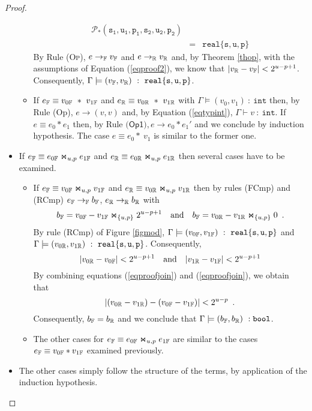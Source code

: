\begin{proof}
\begin{itemize}
\begin{itemize}
$$\begin{array}{rcl}
{\mathcal{P}_\ast(\mathtt{s_1},\mathtt{u_1},\mathtt{p_1},\mathtt{s_2},\mathtt{u_2},\mathtt{p_2})}\\
&=&\mathtt{real\{s,u,p\}}
\end{array}
$$
By Rule \textsc{(Op)}, $e\rightarrow_{\mathbb{F}} v_{\mathbb{F}}$ and $e\rightarrow_{\mathbb{R}} v_{\mathbb{R}}$ and, 
by Theorem \ref{thop}, with  the assumptions of Equation (\ref{eqproof2}), we know that $|v_{\mathbb{R}}-v_{\mathbb{F}}|<2^{u-p+1}$.
Consequently, $\Gamma\models (v_\bbf,v_\bbr)\ :\ \F{s}{u}{p}$.
\item If $e_\bbf\equiv v_{0\bbf}\ \ast\ v_{1\bbf}$ and $e_\bbr\equiv v_{0\bbr}\ \ast\ v_{1\bbr}$
 with $\Gamma\models( v_0, v_1)\ :\ \mathtt{int}$ then,
by Rule \textsf{(Op)}, $e\rightarrow (v,v)$ and,
by Equation (\ref{eqtypint}), $\Gamma\vdash v\ :\ \mathtt{int}$.
If $e\equiv e_0\ast e_1$ then, by Rule $\textsf{(Op1)}, e\rightarrow e_0\ast e_1'$ and we conclude by
induction hypothesis. The case $e\equiv e_0\ast\ v_1$ is similar to the former one.
\end{itemize}
\item If $e_{\mathbb{F}}\equiv e_{0\mathbb{F}}\Join_{u,p} e_{1\mathbb{F}}$ and $e_{\mathbb{R}}\equiv e_{0\mathbb{R}}\Join_{u,p} e_{1\mathbb{R}}$
then several cases have to be examined.
\begin{itemize}
\item If $e_{\mathbb{F}}\equiv v_{0\mathbb{F}}\Join_{u,p} v_{1\mathbb{F}}$ and
$e_{\mathbb{R}}\equiv v_{0\mathbb{R}}\Join_{u,p} v_{1\mathbb{R}}$
 then by rules \textsf{(FCmp)} and \textsf{(RCmp)}
$e_{\mathbb{F}}\rightarrow_{\mathbb{F}} b_{\mathbb{F}}$, $e_{\mathbb{R}}\rightarrow_{\mathbb{R}} b_{\mathbb{R}}$ with
\begin{equation}\label{eqproofjoin}
b_{\mathbb{F}}=     v_{0\mathbb{F}}- v_{1\mathbb{F}} \Join_{\{u,p\}} 2^{u-p+1}
\quad\text{and}\quad
b_{\mathbb{F}}=     v_{0\mathbb{R}} -v_{1\mathbb{R}} \Join_{\{u,p\}} 0 \enspace .
\end{equation}
By rule \textsf{(RCmp)} of Figure \ref{figmod}, $\Gamma\models (v_{0\bbf},v_{1\bbf})\ :\ \F{s}{u}{p}$
and $\Gamma\models (v_{0\mathbb{R}},v_{1\mathbb{R}})\ :\ \mathtt{real\{s,u,p\}}$.
Consequently,
\begin{equation}
|v_{0\mathbb{R}}-v_{0\mathbb{F}}| < 2^{u-p+1}\quad\text{and}\quad |v_{1\mathbb{R}}-v_{1\mathbb{F}}| < 2^{u-p+1}
\end{equation}
By combining equations (\ref{eqproofjoin}) and (\ref{eqproofjoin}), we obtain that
\begin{equation}
|(v_{0\mathbb{R}}-v_{1\mathbb{R}})-(v_{0\mathbb{F}}-v_{1\mathbb{F}})| < 2^{u-p}\enspace .
\end{equation}
Consequently, $b_{\mathbb{F}}=b_{\mathbb{R}}$ and we conclude that $\Gamma\models (b_{\mathbb{F}},b_{\mathbb{R}})\ : \mathtt{bool}$.
\item The other cases for $e_{\mathbb{F}}\equiv e_{0\mathbb{F}}\Join_{u,p} e_{1\mathbb{F}}$
are similar to the cases $e_{\mathbb{F}}\equiv v_{0\mathbb{F}}\ast v_{1\mathbb{F}}$ examined previously.
\end{itemize}
\item The other cases simply follow the structure of the terms, by application of the induction hypothesis.
\end{itemize}
\end{proof}



